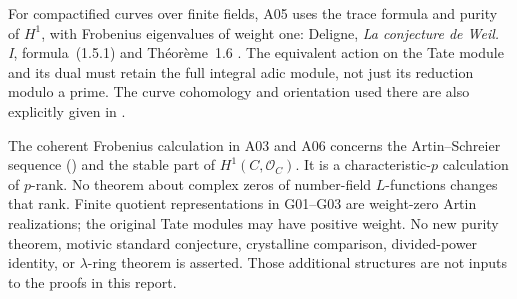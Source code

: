 For compactified curves over finite fields, A05 uses the trace
formula and purity of $H^1$, with Frobenius eigenvalues of weight one:
Deligne, \emph{La conjecture de Weil. I}, formula~(1.5.1) and
Th\'eor\`eme~1.6 \cite{WeilI}. The equivalent action on the
Tate module and its dual must retain the full integral adic module,
not just its reduction modulo a prime. The curve cohomology and
orientation used there are also explicitly given in
\cite[Proposition~14.2 and Remark~14.10]{MilneLEC}.

The coherent Frobenius calculation in A03 and A06 concerns the
Artin--Schreier sequence (\cite[Example~7.9(b)]{MilneLEC}) and the stable part of $H^1(C,\mathcal O_C)$.
It is a characteristic-$p$ calculation of $p$-rank. No theorem about
complex zeros of number-field $L$-functions changes that rank.
Finite quotient representations in G01--G03 are weight-zero Artin
realizations; the original Tate modules may have positive weight.
No new purity theorem, motivic standard conjecture, crystalline
comparison, divided-power identity, or $\lambda$-ring theorem is
asserted. Those additional structures are not inputs to the proofs
in this report.
